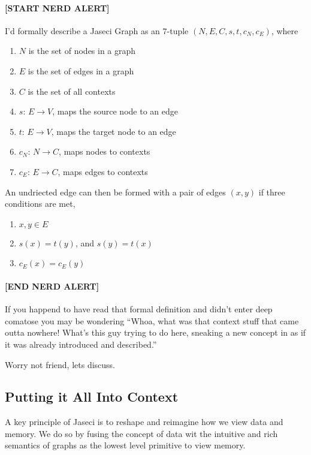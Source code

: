 \documentclass{book}
\begin{document}
\paragraph{[START NERD ALERT]}
\par
I'd formally describe a Jaseci Graph as an $7$-tuple $(N,E,C,s,t,c_N,c_E)$, where
\begin{enumerate}
    \item $N$ is the set of nodes in a graph
    \item $E$ is the set of edges in a graph
    \item $C$ is the set of all contexts
    \item $s$: $E \rightarrow V$, maps the source node to an edge
    \item $t$: $E \rightarrow V$,  maps the target node to an edge
    \item $c_N$: $N \rightarrow C$, maps nodes to contexts
    \item $c_E$: $E \rightarrow C$, maps edges to contexts
\end{enumerate}
An undriected edge can then be formed with a pair of edges $(x, y)$ if three conditions are met,
\begin{enumerate}
    \item $x, y \in E$
    \item $s(x) = t(y)$, and $s(y) = t(x)$
    \item $c_E(x) = c_E(y)$
\end{enumerate}
\paragraph{[END NERD ALERT]}
\par
If you happend to have read that formal definition and didn't enter deep comatose you may be wondering ``Whoa, what was that context stuff that came outta nowhere! What's this guy trying to do here, sneaking a new concept in as if it was already introduced and described.''
\par
Worry not friend, lets discuss.
\subsection{Putting it All Into Context}

A key principle of Jaseci is to reshape and reimagine how we view data and memory. We do so by fusing the concept of data wit the intuitive and rich semantics of graphs as the lowest level primitive to view memory.
\end{document}
